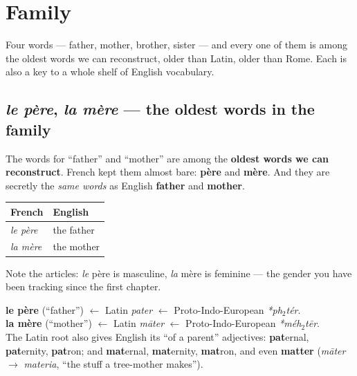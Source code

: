 \chapter{Family}
\label{ch:family}

Four words --- father, mother, brother, sister --- and every one of them is
among the oldest words we can reconstruct, older than Latin, older than Rome.
Each is also a key to a whole shelf of English vocabulary.

\section{\emph{le p\`{e}re}, \emph{la m\`{e}re} --- the oldest words in the family}
\label{lesson:parents}

The words for ``father'' and ``mother'' are among the \textbf{oldest words we
can reconstruct}. French kept them almost bare: \textbf{p\`{e}re} and
\textbf{m\`{e}re}. And they are secretly the \emph{same words} as English
\textbf{father} and \textbf{mother}.

\begin{center}
\begin{tabular}{@{}ll@{}}
\toprule
French & English \\
\midrule
\emph{le p\`{e}re} & the father \\
\emph{la m\`{e}re} & the mother \\
\bottomrule
\end{tabular}
\end{center}

Note the articles: \emph{le} p\`{e}re is masculine, \emph{la} m\`{e}re is
feminine --- the gender you have been tracking since the first chapter.

\begin{cousinweb}
\textbf{le p\`{e}re} (``father'') $\leftarrow$ Latin \emph{pater} $\leftarrow$
Proto-Indo-European \emph{*ph$_2$t\'{e}r}.\\[3pt]
\textbf{la m\`{e}re} (``mother'') $\leftarrow$ Latin \emph{m\=ater}
$\leftarrow$ Proto-Indo-European \emph{*m\'{e}h$_2$t\=er}.\\[3pt]
The Latin root also gives English its ``of a parent'' adjectives:
\textbf{pat}ernal, \textbf{pat}ernity, \textbf{pat}ron; and
\textbf{mat}ernal, \textbf{mat}ernity, \textbf{mat}ron, and even
\textbf{matter} (\emph{m\=ater} $\to$ \emph{materia}, ``the stuff a
tree-mother makes'').
\end{cousinweb}

